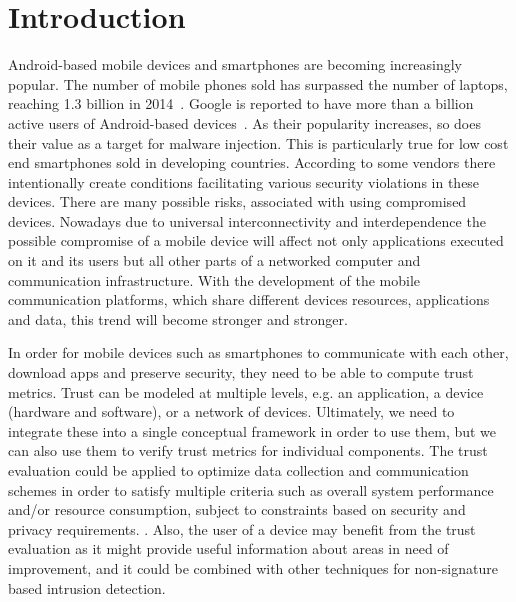 \section{Introduction}

Android-based mobile devices and smartphones are becoming increasingly popular.  The number of mobile phones
sold has surpassed the number of laptops, reaching 1.3 billion in 
2014~\cite{market}.  Google is 
reported to have more than a billion active users of 
Android-based devices~\cite{android-users}.  
As their popularity increases, so does their value as
a target for malware injection.  
This is particularly true for low cost end smartphones sold in developing countries. According to \cite{zheng2014droidray}
some vendors there intentionally create conditions facilitating various security violations in these devices.
 There are many possible risks, associated with using compromised devices.  Nowadays due to universal interconnectivity and 
interdependence the 
possible compromise of a mobile device will affect not only applications executed on it and its users but all other parts 
of a networked computer and communication infrastructure.
With the development of the mobile communication platforms, which share different devices resources, applications and data, 
this trend will become stronger and stronger. 

In order for mobile devices such as smartphones to communicate with each other, download apps and preserve security, they need to
be able to compute trust metrics.   Trust can be modeled at 
multiple levels, e.g. an application, a device (hardware and software), or a network of devices.  Ultimately, we need to 
integrate these into a single conceptual framework in order to use them, but we can also use them to verify trust metrics
for individual components.
The trust evaluation  could 
be applied to optimize data collection and communication schemes in order to satisfy multiple criteria such as overall 
system performance and/or resource consumption, subject to constraints based on security and privacy requirements.
. Also, the user of a device may benefit from the trust evaluation as it might 
provide useful information about areas in need of improvement, and it could be combined with other techniques for
 non-signature based intrusion detection.

